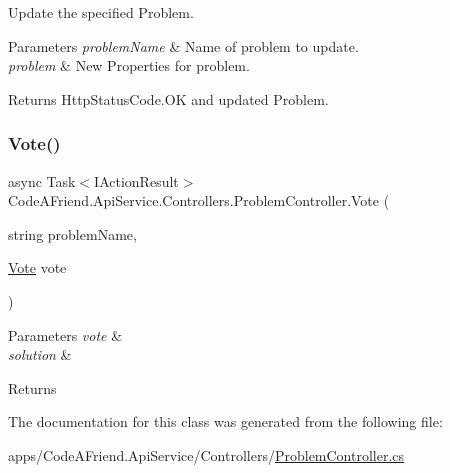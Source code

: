Update the specified Problem. 


\begin{DoxyParams}{Parameters}
{\em problem\+Name} & Name of problem to update.\\
\hline
{\em problem} & New Properties for problem.\\
\hline
\end{DoxyParams}
\begin{DoxyReturn}{Returns}
Http\+Status\+Code.\+OK and updated Problem.
\end{DoxyReturn}
\mbox{\label{class_code_a_friend_1_1_api_service_1_1_controllers_1_1_problem_controller_a45c84969b2e5ac1fc9fd5c6c35627068}} 
\subsubsection{\texorpdfstring{Vote()}{Vote()}}
{\footnotesize\ttfamily async Task$<$I\+Action\+Result$>$ Code\+A\+Friend.\+Api\+Service.\+Controllers.\+Problem\+Controller.\+Vote (\begin{DoxyParamCaption}\item[{string}]{problem\+Name,  }\item[{\mbox{\hyperlink{class_code_a_friend_1_1_data_model_1_1_vote}{Vote}}}]{vote }\end{DoxyParamCaption})}






\begin{DoxyParams}{Parameters}
{\em vote} & \\
\hline
{\em solution} & \\
\hline
\end{DoxyParams}
\begin{DoxyReturn}{Returns}

\end{DoxyReturn}


The documentation for this class was generated from the following file\+:\begin{DoxyCompactItemize}
\item 
apps/\+Code\+A\+Friend.\+Api\+Service/\+Controllers/\mbox{\hyperlink{_problem_controller_8cs}{Problem\+Controller.\+cs}}\end{DoxyCompactItemize}
